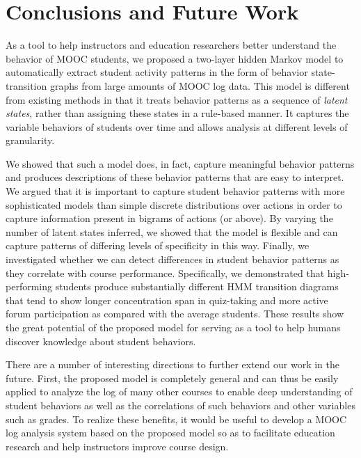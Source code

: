 \section{Conclusions and Future Work}
As a tool to help instructors and education researchers better understand
the behavior of MOOC students, we proposed a two-layer hidden Markov model
to automatically extract student activity patterns in the form of behavior
state-transition graphs from large amounts of MOOC log data. This model is
different from existing methods in that it treats behavior patterns as a
sequence of \emph{latent states}, rather than assigning these states in a
rule-based manner. It captures the variable behaviors of students over time
and allows analysis at different levels of granularity.

We showed that such a model does, in fact, capture meaningful behavior
patterns and produces descriptions of these behavior patterns that are easy
to interpret. We argued that it is important to capture student behavior
patterns with more sophisticated models than simple discrete distributions
over actions in order to capture information present in bigrams of actions
(or above). By varying the number of latent states inferred, we showed that
the model is flexible and can capture patterns of differing levels of
specificity in this way.  Finally, we investigated whether we can detect
differences in student behavior patterns as they correlate with course
performance. Specifically, we demonstrated that high-performing students
produce substantially different HMM transition diagrams that tend to show
longer concentration span in quiz-taking and more active  forum
participation as compared with the average students.  These results show
the great potential of the proposed model for serving as a tool to help
humans discover knowledge about student behaviors.


There are a number of interesting directions to further extend our work in
the future.  First, the proposed model is completely general and can thus
be easily applied to analyze the log of many other courses to enable deep
understanding of student behaviors as well as the correlations of such
behaviors and other variables such as grades. To realize these benefits, it
would be useful to develop a MOOC log analysis system based on the proposed
model so as to facilitate education research and help instructors improve
course design.


